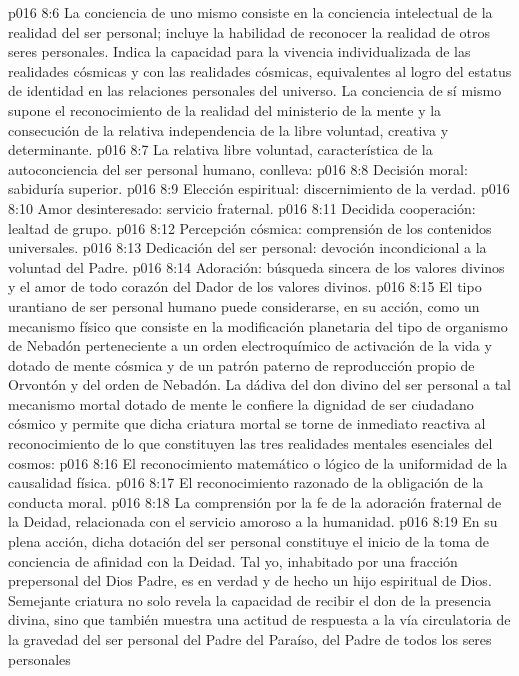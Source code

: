 \vs p016 8:6 La conciencia de uno mismo consiste en la conciencia intelectual de la realidad del ser personal; incluye la habilidad de reconocer la realidad de otros seres personales. Indica la capacidad para la vivencia individualizada de las realidades cósmicas y con las realidades cósmicas, equivalentes al logro del estatus de identidad en las relaciones personales del universo. La conciencia de sí mismo supone el reconocimiento de la realidad del ministerio de la mente y la consecución de la relativa independencia de la libre voluntad, creativa y determinante.
\vs p016 8:7 \pc La relativa libre voluntad, característica de la autoconciencia del ser personal humano, conlleva:
\vs p016 8:8 Decisión moral: sabiduría superior.
\vs p016 8:9 Elección espiritual: discernimiento de la verdad.
\vs p016 8:10 Amor desinteresado: servicio fraternal.
\vs p016 8:11 Decidida cooperación: lealtad de grupo.
\vs p016 8:12 Percepción cósmica: comprensión de los contenidos universales.
\vs p016 8:13 Dedicación del ser personal: devoción incondicional a la voluntad del Padre.
\vs p016 8:14 Adoración: búsqueda sincera de los valores divinos y el amor de todo corazón del Dador de los valores divinos.
\vs p016 8:15 \pc El tipo urantiano de ser personal humano puede considerarse, en su acción, como un mecanismo físico que consiste en la modificación planetaria del tipo de organismo de Nebadón perteneciente a un orden electroquímico de activación de la vida y dotado de mente cósmica y de un patrón paterno de reproducción propio de Orvontón y del orden de Nebadón. La dádiva del don divino del ser personal a tal mecanismo mortal dotado de mente le confiere la dignidad de ser ciudadano cósmico y permite que dicha criatura mortal se torne de inmediato reactiva al reconocimiento de lo que constituyen las tres realidades mentales esenciales del cosmos:
\vs p016 8:16 El reconocimiento matemático o lógico de la uniformidad de la causalidad física.
\vs p016 8:17 El reconocimiento razonado de la obligación de la conducta moral.
\vs p016 8:18 La comprensión por la fe de la adoración fraternal de la Deidad, relacionada con el servicio amoroso a la humanidad.
\vs p016 8:19 \pc En su plena acción, dicha dotación del ser personal constituye el inicio de la toma de conciencia de afinidad con la Deidad. Tal yo, inhabitado por una fracción prepersonal del Dios Padre, es en verdad y de hecho un hijo espiritual de Dios. Semejante criatura no solo revela la capacidad de recibir el don de la presencia divina, sino que también muestra una actitud de respuesta a la vía circulatoria de la gravedad del ser personal del Padre del Paraíso, del Padre de todos los seres personales
